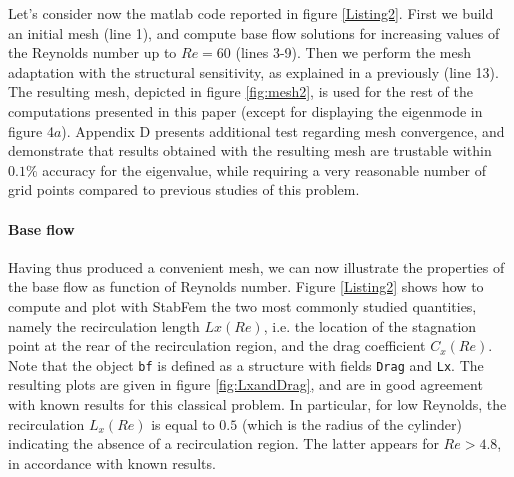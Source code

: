 \documentclass[twocolumn,10pt]{asme2ej}
\begin{document}
Let's consider now the matlab code reported in figure \ref{Listing2}. First we build an initial mesh (line 1), and compute base flow solutions for increasing values of the Reynolds number up to $Re = 60$ (lines 3-9).
Then we perform the mesh adaptation with the structural sensitivity, as explained in a previously (line 13). 
The resulting mesh, depicted in figure \ref{fig:mesh2}, is used for the rest of the computations presented in this paper (except for displaying the eigenmode in figure 4$a$). 
Appendix D presents additional test regarding mesh convergence, and demonstrate that results obtained with the resulting mesh are trustable within $0.1\%$ accuracy for the eigenvalue, while requiring a very reasonable number of grid points compared to previous studies of this problem. 









\paragraph{Base flow}

Having thus produced a convenient mesh, we can now illustrate the properties of the base flow as function of Reynolds number. Figure \ref{Listing2} shows how to compute and plot with StabFem the two most commonly studied quantities, namely the recirculation length $Lx(Re)$, i.e. the location of the stagnation point at the rear of the recirculation region, and the drag coefficient $C_x(Re)$.
Note that the object \verb|bf| is defined as a structure with fields \verb|Drag| and \verb|Lx|. 
The resulting plots are given in figure \ref{fig:LxandDrag}, and are in good agreement with known results for this classical problem.
In particular, for low Reynolds, the recirculation $L_x(Re)$ is equal to $0.5$ (which is the radius of the cylinder) indicating the absence of a recirculation region. The latter appears for $Re > 4.8$, in accordance with known results.
\end{document}
